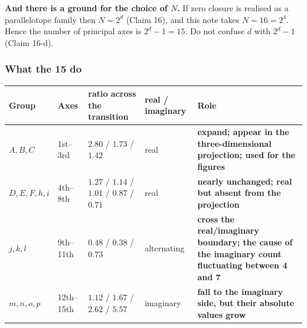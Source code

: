 \documentclass[
  10pt,
]{article}
\newcounter{none} %
\begin{document}
\textbf{And there is a ground for the choice of \(N\).} If zero closure
is realised as a parallelotope family then \(N=2^d\) (Claim 16), and
this note takes \(N=16=2^4\). Hence the number of principal axes is
\(2^d-1 = 15\). Do not confuse \(d\) with \(2^d-1\) (Claim 16-d).

\subsubsection{What the 15 do}\label{what-the-15-do}

{\def\LTcaptype{none} %
\begin{longtable}[]{@{}
  >{\raggedright\arraybackslash}p{}
  >{\raggedright\arraybackslash}p{}
  >{\raggedright\arraybackslash}p{}
  >{\raggedright\arraybackslash}p{}
  >{\raggedright\arraybackslash}p{}@{}}
\toprule\noalign{}
\begin{minipage}[b]{\linewidth}\raggedright
Group
\end{minipage} & \begin{minipage}[b]{\linewidth}\raggedright
Axes
\end{minipage} & \begin{minipage}[b]{\linewidth}\raggedright
ratio across the transition
\end{minipage} & \begin{minipage}[b]{\linewidth}\raggedright
real / imaginary
\end{minipage} & \begin{minipage}[b]{\linewidth}\raggedright
Role
\end{minipage} \\
\midrule\noalign{}
\endhead
\bottomrule\noalign{}
\endlastfoot
\textbf{\(A,B,C\)} & 1st--3rd & \(2.80\) / \(1.73\) / \(1.42\) & real &
\textbf{expand; appear in the three-dimensional projection; used for the
figures} \\
\textbf{\(D,E,F,h,i\)} & 4th--8th & \(1.27\) / \(1.14\) / \(1.01\) /
\(0.87\) / \(0.71\) & real & \textbf{nearly unchanged; real but absent
from the projection} \\
\textbf{\(j,k,l\)} & 9th--11th & \(0.48\) / \(0.38\) / \(0.73\) &
alternating & \textbf{cross the real/imaginary boundary; the cause of
the imaginary count fluctuating between 4 and 7} \\
\textbf{\(m,n,o,p\)} & 12th--15th & \(1.12\) / \(1.67\) / \(2.62\) /
\(5.57\) & imaginary & \textbf{fall to the imaginary side, but their
absolute values grow} \\
\end{longtable}
}
\end{document}

